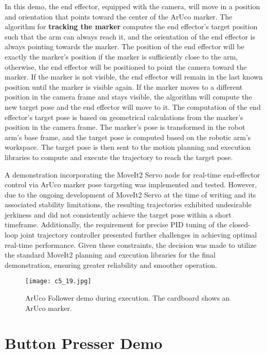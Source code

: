 In this demo, the end effector, equipped with the camera, will move in a position and orientation that points
toward the center of the
ArUco marker. The algorithm for \textbf{tracking the marker} computes the end effector's target position such that
the arm can always reach it, and the orientation of the end effector is always pointing towards the marker.
The position of the end effector will be exactly the marker's position if the marker is sufficiently close to the arm,
otherwise, the end effector will be positioned to point the camera toward the marker.
If the marker is not visible, the end effector will remain in the last known position until the marker is
visible again. If the marker moves to a different position in the camera frame and stays visible,
the algorithm will compute the new target pose and the end effector will move to it.
The computation of the end effector's target pose is based on geometrical calculations from the marker's position
in the camera frame. The marker's pose is transformed in the robot arm's base frame, and the target pose is
computed based on the robotic arm's workspace. The target pose is then sent to the motion planning and execution
libraries to compute and execute the trajectory to reach the target pose.

A demonstration incorporating the MoveIt2 Servo node for real-time end-effector control via ArUco marker pose
targeting was implemented and tested. However, due to the ongoing development of MoveIt2 Servo at the time of
writing and its associated stability limitations, the resulting trajectories exhibited undesirable jerkiness 
and did not consistently achieve the target pose within a short timeframe. 
Additionally, the requirement for precise PID tuning of the closed-loop joint trajectory controller presented further
challenges in achieving optimal real-time performance. Given these constraints, the decision was made to utilize 
the standard MoveIt2 planning and execution libraries for the final demonstration,
ensuring greater reliability and smoother operation.

\begin{figure}[t]
    \centering
    \texttt{[image: c5\_19.jpg]}
    \caption{ArUco Follower demo during execution. The cardboard shows an ArUco marker.}
    \label{fig:arucofollower}
\end{figure}

\section{Button Presser Demo}

